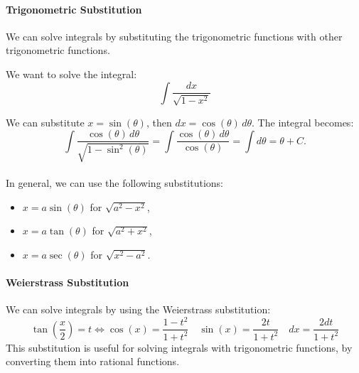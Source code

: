 \documentclass[11pt]{article}
\begin{document}
\paragraph{Trigonometric Substitution} We can solve integrals by substituting the trigonometric functions with other trigonometric functions.
\begin{example}
We want to solve the integral:
$$ \int \frac{dx}{\sqrt{1 - x^2}} $$
\end{example}
We can substitute $x = \sin(\theta)$, then $dx = \cos(\theta) \, d\theta$. The integral becomes:
$$ \int \frac{\cos(\theta) \, d\theta}{\sqrt{1 - \sin^2(\theta)}} = \int \frac{\cos(\theta) \, d\theta}{\cos(\theta)} = \int d\theta = \theta + C. $$
\paragraph{} In general, we can use the following substitutions:
\begin{itemize}
    \item $x = a\sin(\theta)$ for $\sqrt{a^2 - x^2}$,
    \item $x = a\tan(\theta)$ for $\sqrt{a^2 + x^2}$,
    \item $x = a\sec(\theta)$ for $\sqrt{x^2 - a^2}$.
\end{itemize}
\paragraph{Weierstrass Substitution} We can solve integrals by using the Weierstrass substitution:
\begin{equation}
    \tan\left(\frac{x}{2}\right) = t \Leftrightarrow \cos(x) = \frac{1-t^2}{1+t^2} \quad \sin(x) = \frac{2t}{1+t^2} \quad dx = \frac{2dt}{1+t^2}
\end{equation}
This substitution is useful for solving integrals with trigonometric functions, by converting them into rational functions.
\end{document}
